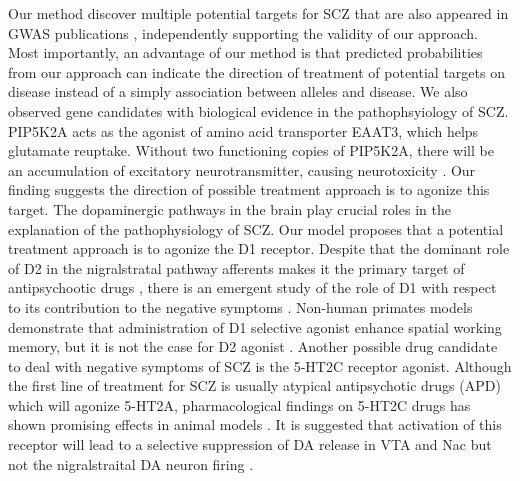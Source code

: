    Our method discover multiple potential targets for SCZ that are also appeared in GWAS publications \cite{zhang2015functional,golimbet2014study,lee2013pathway,sinclair2012glucocorticoid,ahmad2015association,kishi2011sirt1,athanasiou2011candidate,hoenicka2010sexually,tein2008short,sun2004cldn5,chen2004case,yu2008association,hashimoto2005functional}, independently supporting the validity of our approach. Most importantly, an advantage of our method is that predicted probabilities from our approach can indicate the direction of treatment of potential targets on disease instead of a simply association between alleles and disease. We also observed gene candidates with biological evidence in the pathophsyiology of SCZ. PIP5K2A acts as the agonist of amino acid transporter EAAT3, which helps glutamate reuptake. Without two functioning copies of PIP5K2A, there will be an accumulation of excitatory neurotransmitter, causing neurotoxicity \cite{fedorenko2009pip5k2a}. Our finding suggests the direction of possible treatment approach is to agonize this target. The dopaminergic pathways in the brain play crucial roles in the explanation of the pathophysiology of SCZ. Our model proposes that a potential treatment approach is to agonize the D1 receptor. Despite that the dominant role of D2 in the nigralstratal pathway afferents makes it the primary target of antipsychootic drugs \cite{howes2009dopamine}, there is an emergent study of the role of D1 with respect to its contribution to the negative symptoms \cite{goldman2004targeting}. Non-human primates models demonstrate that administration of D1 selective agonist enhance spatial working memory, but it is not the case for D2 agonist \cite{goldman2004targeting}. Another possible drug candidate to deal with negative symptoms of SCZ is the 5-HT2C receptor agonist. Although the first line of treatment for SCZ is usually atypical antipsychotic drugs (APD) which will agonize 5-HT2A, pharmacological findings on 5-HT2C drugs has shown promising effects in animal models \cite{floresco2009neural,hemrick2002comparison,pogorelov20175}. It is suggested that activation of this receptor will lead to a selective suppression of DA release in VTA and Nac but not the nigralstraital DA neuron firing \cite{meltzer20115}.
  
